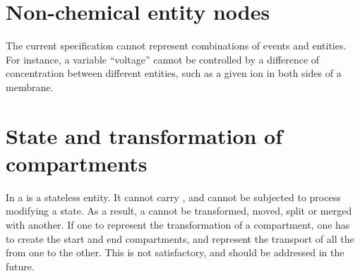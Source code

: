 \section{Non-chemical entity nodes}

The current specification cannot represent combinations of events and entities. For instance, a variable ``voltage'' cannot be controlled by a difference of concentration between different entities, such as a given ion in both sides of a membrane. 

%

\section{State and transformation of compartments}

In \SBGNPDLone a  is a stateless entity. It cannot carry  , and cannot be subjected to process modifying a state. As a result, a  cannot be transformed, moved, split or merged with another. If one  to represent the transformation of a compartment, one has to create the start and end compartments, and represent the transport of all the  from one to the other. This is not satisfactory, and should be addressed in the future.
